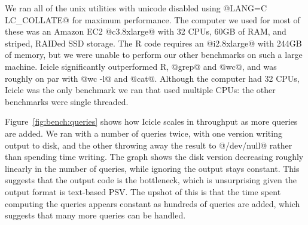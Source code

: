 We ran all of the unix utilities with unicode disabled using @LANG=C LC_COLLATE@ for maximum performance.
The computer we used for most of these was an Amazon EC2 @c3.8xlarge@ with 32 CPUs, 60GB of RAM, and striped, RAIDed SSD storage.
The R code requires an @i2.8xlarge@ with 244GB of memory, but we were unable to perform our other benchmarks on such a large machine.
Icicle significantly outperformed R, @grep@ and @wc@, and was roughly on par with @wc -l@ and @cat@.
Although the computer had 32 CPUs, Icicle was the only benchmark we ran that used multiple CPUs: the other benchmarks were single threaded.

Figure~\ref{fig:bench:queries} shows how Icicle scales in throughput as more queries are added.
We ran with a number of queries twice, with one version writing output to disk, and the other throwing away the result to @/dev/null@ rather than spending time writing.
The graph shows the disk version decreasing roughly linearly in the number of queries, while ignoring the output stays constant.
This suggests that the output code is the bottleneck, which is unsurprising given the output format is text-based PSV.
The upshot of this is that the time spent computing the queries appears constant as hundreds of queries are added, which suggests that many more queries can be handled.


